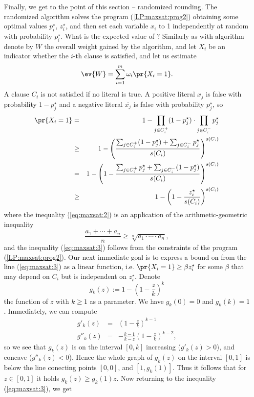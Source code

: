 \noindent
Finally, we get to the point of this section -- randomized rounding. The randomized algorithm 
solves the program (\ref{LP:maxsat:prog2}) obtaining some optimal values  $p_i^\star$, $z_i^\star$, and
then set each variable $x_i$ to 1 independently at random with probability $p_i^\star$.
What is the expected value of ? Similarly as with algorithm  denote by $W$ the
overall weight gained by the algorithm, and let $X_i$ be an indicator whether the $i$-th clause is satisfied,
and let us estimate 
$$\ev{W}
=\sum_{i=1}^m\omega_i\pr{X_i=1}.$$
A clause $C_i$ is not satisfied if no literal is true. A positive literal  $x_j$
is false with probability  $1-p_j^\star$  and a negative literal $\overline{x_j}$ is false with
probability $p_j^\star$, so
\begin{eqnarray}
\label{eq:maxsat:1}\pr{X_i=1}&=&1-\prod_{j\in C_i^+}(1-p_j^\star)\cdot\prod_{j\in C_i^-}p_j^\star\\
\label{eq:maxsat:2}&\ge&1-\left(\frac{\sum_{j\in C_i^+}(1-p_j^\star)+\sum_{j\in C_i^-}p_j^\star}{s(C_i)}\right)^{s(C_i)}\\
&=&1-\left(1-\frac{\sum_{j\in C_i^+}p_j^\star+\sum_{j\in C_i^-}(1-p_j^\star)}{s(C_i)}\right)^{s(C_i)}\notag\\
\label{eq:maxsat:3}&\ge&1-\left(1-\frac{z_i^\star}{s(C_i)}\right)^{s(C_i)}
\end{eqnarray}
where the inequality (\ref{eq:maxsat:2}) is an application of the arithmetic-geometric inequality
$$\frac{a_1+\cdots+a_n}{n}\ge\sqrt[n]{a_1\cdot\cdots\cdot a_n},$$
and the inequality (\ref{eq:maxsat:3})
follows from the constraints of the program (\ref{LP:maxsat:prog2}). 
Our next immediate goal is to express a bound on  
from the line (\ref{eq:maxsat:3}) as a linear function, i.e.
$\pr{X_i=1}\ge\beta z_i^\star$ for some $\beta$ that may depend on $C_i$ but is independent on  $z_i^\star$.
Denote
$$g_k(z):=1-\left(1-\frac{z}{k}\right)^k$$
the function of  $z$ with $k\ge1$ as a parameter. We have $g_k(0)=0$ and  $g_k(k)=1$. 
Immediately, we can compute
\begin{eqnarray*}
g'_k(z) &=& \left(1-\frac{z}{k}\right)^{k-1} \\
g''_k(z) &=& -\frac{k-1}{k-z}\left(1-\frac{z}{k}\right)^{k-2},
\end{eqnarray*}
so we see that  $g_k(z)$ is on the interval $[0,k]$ increasing ($g'_k(z)>0$), and concave ($g''_k(z)<0$).
Hence the whole graph of $g_k(z)$ on the interval $[0,1]$ is below the line conecting points $[0,0]$, and
$[1,g_k(1)]$. Thus it follows that for $z\in[0,1]$ it holds  $g_k(z)\ge g_k(1)z$.
Now returning to the inequality (\ref{eq:maxsat:3}),
we get


